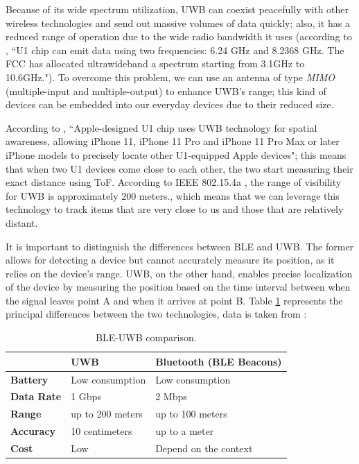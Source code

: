 \documentclass[english]{article}
\begin{document}
Because of its wide spectrum utilization, UWB can coexist peacefully with other wireless technologies and send out massive volumes of data quickly; also, it has a reduced range of operation due to the wide radio bandwidth it uses (according to \cite{Zafar2019}, ``U1 chip can emit data using two frequencies: 6.24 GHz and 8.2368 GHz. The FCC has allocated ultrawideband a spectrum starting from 3.1GHz to 10.6GHz."). To overcome this problem, we can use an antenna of type \textit{MIMO} (multiple-input and multiple-output) to enhance UWB's range; this kind of devices can be embedded into our everyday devices due to their reduced size.

According to \cite{aps}, ``Apple-designed U1 chip uses UWB technology for spatial awareness, allowing iPhone 11, iPhone 11 Pro and iPhone 11 Pro Max or later iPhone models to precisely locate other U1-equipped Apple devices"; this means that when two U1 devices come close to each other, the two start measuring their exact distance using ToF. According to IEEE 802.15.4a \cite{5394030}, the range of visibility for UWB is approximately 200 meters., which means that we can leverage this technology to track items that are very close to us and those that are relatively distant.

It is important to distinguish the differences between BLE and UWB. The former allows for detecting a device but cannot accurately measure its position, as it relies on the device's range. UWB, on the other hand, enables precise localization of the device by measuring the position based on the time interval between when the signal leaves point A and when it arrives at point B.
Table \ref{tableu} represents the principal differences between the two technologies, data is taken from \cite{encstore}:
\begin{table}[h] 
\caption{BLE-UWB comparison.}
  \centering
  
    \begin{tabular}{l|l|l|}
      \cline{2-3}
      {}                               & {\textbf{UWB}}                & { \textbf{Bluetooth (BLE Beacons)}} \\ \hline
      \multicolumn{1}{|l|}{{  \textbf{Battery}}}  & {  Low consumption}             & {  Low consumption}                  \\ \hline
      \multicolumn{1}{|l|}{{  \textbf{Data Rate}}}  & { 1 Gbps }             & { 2 Mbps }                  \\ \hline
      \multicolumn{1}{|l|}{{  \textbf{Range}}}    & {  up to 200 meters} & {  up to 100 meters}       \\ \hline
      \multicolumn{1}{|l|}{{  \textbf{Accuracy}}} & {  10 centimeters} & {  up to a meter}                    \\ \hline
      \multicolumn{1}{|l|}{{  \textbf{Cost}}}     & {  Low}                         & {Depend on the context }                              \\ \hline
    \end{tabular}
    \label{tableu}
  \end{table}
\end{document}
